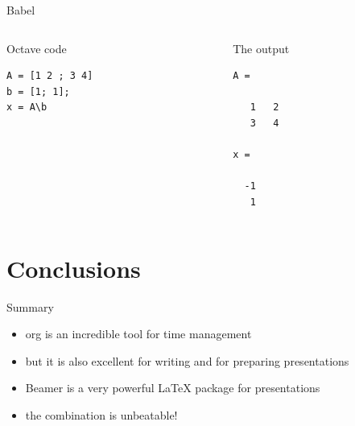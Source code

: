 \documentclass[bigger]{beamer}
\begin{document}
\begin{frame}[label={sec:orgf9f5b82},fragile]{Babel}
 \begin{columns}
\begin{column}{0.45\columnwidth}
\begin{block}{Octave code}
\begin{verbatim}
A = [1 2 ; 3 4]
b = [1; 1];
x = A\b
\end{verbatim}
\end{block}
\end{column}

\begin{column}{0.4\columnwidth}
\begin{block}{The output}
\begin{verbatim}
A =

   1   2
   3   4

x =

  -1
   1

\end{verbatim}
\end{block}
\end{column}
\end{columns}
\end{frame}

\section{Conclusions}
\label{sec:org24b7f15}

\begin{frame}[label={sec:orgb364d32}]{Summary}
\begin{itemize}
\item org is an incredible tool for time management
\item \alert{but} it is also excellent for writing and for preparing presentations
\item Beamer is a very powerful \LaTeX{} package for presentations
\item the combination is unbeatable!
\end{itemize}
\end{frame}
\end{document}
